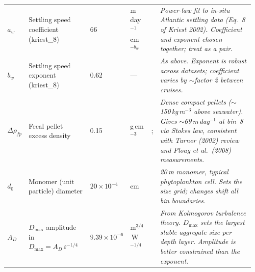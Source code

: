 \documentclass[11pt,a4paper]{article}
\newcommand{\conf}[1]{\textit{#1}}
\begin{document}
\begin{longtable}{L{2cm} L{5.5cm} C{3cm} L{3.5cm} L{5cm} L{6cm}}
$a_w$ &
Settling speed coefficient (kriest\_8) &
66 &
m\,day$^{-1}$\,cm$^{-b_w}$ &
\citet{kriest2002} &
\conf{Power-law fit to in-situ Atlantic settling data (Eq.~8 of Kriest 2002). Coefficient and exponent chosen together; treat as a pair.} \\[4pt]

$b_w$ &
Settling speed exponent (kriest\_8) &
0.62 &
--- &
\citet{kriest2002} &
\conf{As above. Exponent is robust across datasets; coefficient varies by $\sim$factor 2 between cruises.} \\[4pt]

$\Delta\rho_{fp}$ &
Fecal pellet excess density &
0.15 &
g\,cm$^{-3}$ &
\citet{turner2002}; \citet{ploug2008} &
\conf{Dense compact pellets ($\sim$150\,kg\,m$^{-3}$ above seawater). Gives $\sim$69\,m\,day$^{-1}$ at bin~8 via Stokes law, consistent with Turner (2002) review and Ploug et al.\ (2008) measurements.} \\[4pt]

$d_0$ &
Monomer (unit particle) diameter &
$20\times10^{-4}$ &
cm &
\citet{burd2009} &
\conf{20\,\textmu m monomer, typical phytoplankton cell. Sets the size grid; changes shift all bin boundaries.} \\[4pt]

$A_D$ &
$D_\mathrm{max}$ amplitude in $D_\mathrm{max} = A_D \,\varepsilon^{-1/4}$ &
$9.39\times10^{-6}$ &
m$^{3/4}$\,W$^{-1/4}$ &
\citet{burd2009} &
\conf{From Kolmogorov turbulence theory. $D_\mathrm{max}$ sets the largest stable aggregate size per depth layer. Amplitude is better constrained than the exponent.} \\[4pt]

\end{longtable}

\clearpage

\end{document}
